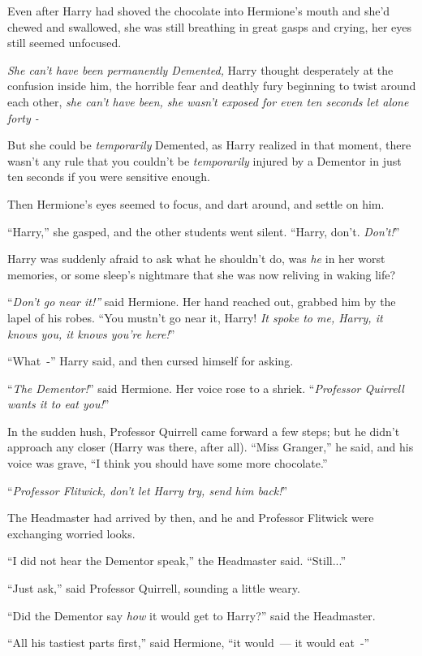 Even after Harry had shoved the chocolate into Hermione's mouth and she'd chewed and swallowed, she was still breathing in great gasps and crying, her eyes still seemed unfocused.

\emph{She can't have been permanently Demented,} Harry thought desperately at the confusion inside him, the horrible fear and deathly fury beginning to twist around each other, \emph{she can't have been, she wasn't exposed for even ten seconds let alone forty -}

But she could be \emph{temporarily} Demented, as Harry realized in that moment, there wasn't any rule that you couldn't be \emph{temporarily} injured by a Dementor in just ten seconds if you were sensitive enough.

Then Hermione's eyes seemed to focus, and dart around, and settle on him.

``Harry,'' she gasped, and the other students went silent. ``Harry, don't. \emph{Don't!}''

Harry was suddenly afraid to ask what he shouldn't do, was \emph{he} in her worst memories, or some sleep's nightmare that she was now reliving in waking life?

``\emph{Don't go near it!''} said Hermione. Her hand reached out, grabbed him by the lapel of his robes. ``You mustn't go near it, Harry! \emph{It spoke to me, Harry, it knows you, it knows you're here!}''

``What~-'' Harry said, and then cursed himself for asking.

``\emph{The Dementor!}'' said Hermione. Her voice rose to a shriek. ``\emph{Professor Quirrell wants it to eat you!}''

In the sudden hush, Professor Quirrell came forward a few steps; but he didn't approach any closer (Harry was there, after all). ``Miss Granger,'' he said, and his voice was grave, ``I think you should have some more chocolate.''

``\emph{Professor Flitwick, don't let Harry try, send him back!}''

The Headmaster had arrived by then, and he and Professor Flitwick were exchanging worried looks.

``I did not hear the Dementor speak,'' the Headmaster said. ``Still...''

``Just ask,'' said Professor Quirrell, sounding a little weary.

``Did the Dementor say \emph{how} it would get to Harry?'' said the Headmaster.

``All his tastiest parts first,'' said Hermione, ``it would~--- it would eat~-''

